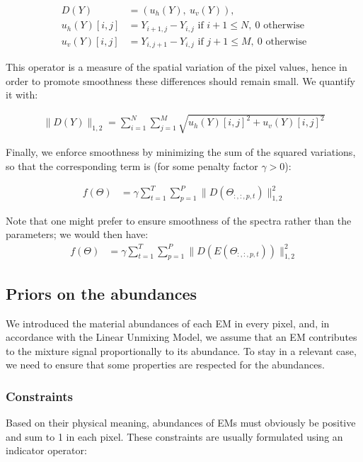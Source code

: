 \documentclass{article}
\begin{document}
\begin{align*}\label{eq:discrete-grad}
  D(Y) &= (u_h (Y),\ u_v (Y)),\\
  u_h (Y) [i, j] &= Y_{i+1, j} - Y_{i, j} \text{ if }i + 1 \leq N,\ 0 \text{ otherwise}\\
  u_v (Y) [i, j] &= Y_{i, j+1} - Y_{i, j} \text{ if }j + 1 \leq M,\ 0 \text{ otherwise}
\end{align*}

This operator is a measure of the spatial variation of the pixel values, hence in order to promote smoothness these differences should remain small. We quantify it with:

\begin{align*}
  \| D(Y) \|_{1,2} = \sum_{i=1}^N \sum_{j=1}^M \sqrt{ u_h (Y)[i, j]^2 + u_v (Y)[i, j]^2 }
\end{align*}

Finally, we enforce smoothness by minimizing the sum of the squared variations, so that the corresponding term is (for some penalty factor $\gamma >0$):

\begin{align}\label{eq:f}
  f(\Theta) &= \gamma \sum_{t = 1}^{T} \sum_{p = 1}^P \| D(\Theta_{:,:,p,t}) \|_{1,2}^2
\end{align}

Note that one might prefer to ensure smoothness of the spectra rather than the parameters; we would then have:
\begin{align*}
  f(\Theta) &= \gamma \sum_{t = 1}^{T} \sum_{p = 1}^P \| D(E(\Theta_{:,:,p,t})) \|_{1,2}^2
\end{align*}

\subsection{Priors on the abundances}
We introduced the material abundances of each EM in every pixel, and, in accordance with the Linear Unmixing Model, we assume that an EM contributes to the mixture signal proportionally to its abundance. To stay in a relevant case, we need to ensure that some properties are respected for the abundances.

\subsubsection{Constraints}

Based on their physical meaning, abundances of EMs must obviously be positive and sum to 1 in each pixel. These constraints are usually formulated using an indicator operator:
\end{document}
